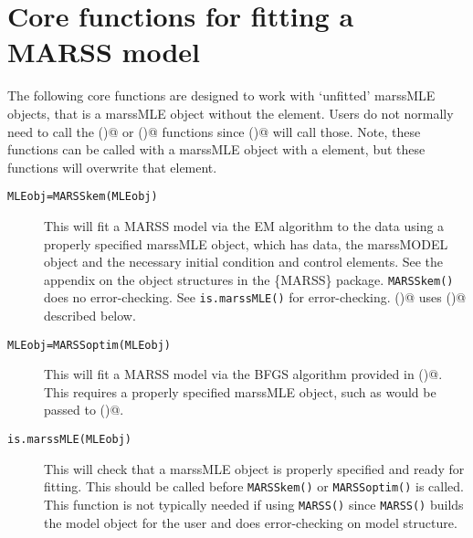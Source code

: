 \section{Core functions for fitting a MARSS model}
The following core functions are designed to work with `unfitted' marssMLE objects, that is a marssMLE object without the \verb@par@ element.  Users do not normally need to call the \verb@MARSSkem()@ or \verb@MARSSoptim()@ functions since \verb@MARSS()@ will call those. Note, these functions can be called with a marssMLE object with a \verb@par@ element, but these functions will overwrite that element.

\begin{description}
	\item[\texttt{MLEobj=MARSSkem(MLEobj)}] This will fit a MARSS model via the EM algorithm to the data using a properly specified marssMLE object, which has data, the marssMODEL object and the necessary initial condition and control elements.  See the appendix on the object structures in the \{MARSS\} package.  \texttt{MARSSkem()}	does no error-checking.  See \texttt{is.marssMLE()} for error-checking. \verb@MARSSkem()@ uses \verb@MARSSkf()@ described below.  
	\item[\texttt{MLEobj=MARSSoptim(MLEobj)}] This will fit a MARSS model via the BFGS algorithm provided in \verb@optim()@. This requires a properly specified marssMLE object, such as would be passed to \verb@MARSSkem()@. 
	\item[\texttt{is.marssMLE(MLEobj)}] This will check that a marssMLE object is properly specified and ready for fitting.  This should be called before \texttt{MARSSkem()} or \texttt{MARSSoptim()} is called.  This function is not typically needed if using \texttt{MARSS()} since \texttt{MARSS()} builds the model object for the user and does error-checking on model structure.
\end{description}

